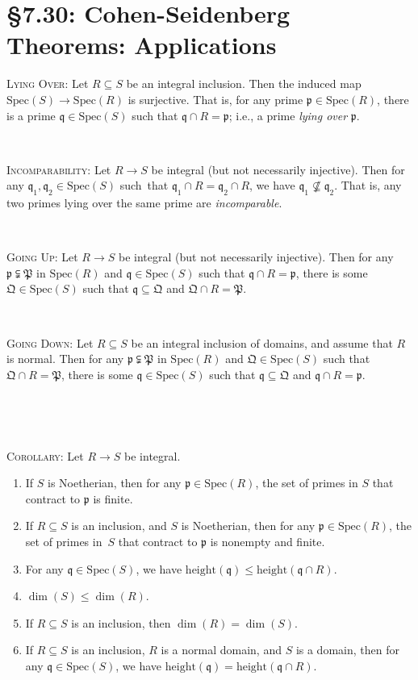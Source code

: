 \documentclass[12pt]{amsart}
\newcommand{\p}{\mathfrak{p}}
\newcommand{\q}{\mathfrak{q}}
\newcommand{\Spec}{\mathrm{Spec}}
\renewcommand{\1}{\mathbbm{1}}
\newcommand{\showsol}[1]{\def\displaysol{#1}}
\begin{document}
\showsol{1}
	
	\thispagestyle{empty}
	
	\section*{\S7.30: Cohen-Seidenberg Theorems: Applications}
	
	\begin{framed}

\noindent \textsc{Lying Over:} Let $R\subseteq S$ be an integral inclusion. Then the induced map ${\Spec(S)\to \Spec(R)}$ is surjective. That is, for any prime $\p\in \Spec(R)$, there is a prime $\q\in \Spec(S)$ such that $\q \cap R =\p$; i.e., a prime \emph{lying over} $\p$.

\

\noindent \textsc{Incomparability:} Let $R\to S$ be integral (but not necessarily injective). Then for any ${\q_1,\q_2\in \Spec(S)}$ such\footnotemark\, that $\q_1 \cap R = \q_2 \cap R$, we have $\q_1 \not\nsubseteq \q_2$. That is, any two primes lying over the same prime are \emph{incomparable}.


\

\noindent \textsc{Going Up:} Let $R\to S$ be integral (but not necessarily injective). Then for any $\p \subsetneqq \mathfrak{P}$ in $\Spec(R)$ and $\q\in \Spec(S)$ such that $\q \cap R = \p$, there is some $\mathfrak{Q}\in \Spec(S)$ such that $\q \subseteq \mathfrak{Q}$ and $\mathfrak{Q} \cap R = \mathfrak{P}$. 

\

\noindent \textsc{Going Down:} Let $R\subseteq S$ be an integral inclusion of domains, and assume that $R$ is normal. Then for any $\p \subsetneqq \mathfrak{P}$  in $\Spec(R)$ and $\mathfrak{Q}\in \Spec(S)$ such that $\mathfrak{Q} \cap R = \mathfrak{P}$, there is some $\q\in \Spec(S)$ such that $\q \subseteq \mathfrak{Q}$ and $\q \cap R = \p$. 

\

\hrulefill

\

\textsc{Corollary:} Let $R\to S$ be integral.
\begin{enumerate}
\item If $S$ is Noetherian, then for any $\p\in \Spec(R)$, the set of primes in $S$ that contract to $\p$ is finite.
\item If $R\subseteq S$ is an inclusion, and $S$ is Noetherian, then for any $\p\in \Spec(R)$, the set of primes in~$S$ that contract to $\p$ is nonempty and finite.
\item For any $\q\in \Spec(S)$, we have $\mathrm{height}(\q) \leq \mathrm{height}(\q \cap R)$.
\item $\dim(S) \leq \dim(R)$.
\item If $R\subseteq S$ is an inclusion, then $\dim(R)=\dim(S)$.
\item If $R\subseteq S$ is an inclusion, $R$ is a normal domain, and $S$ is a domain, then for any ${\q\in \Spec(S)}$, we have ${\mathrm{height}(\q) = \mathrm{height}(\q \cap R)}$.
\end{enumerate}



\end{framed}
\end{document}
